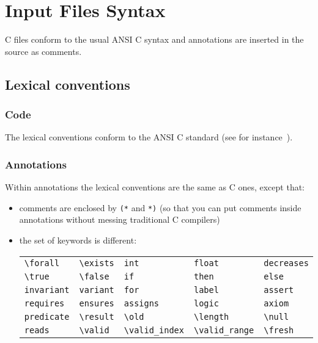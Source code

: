 \documentclass[a4paper,12pt]{report}
\def\result{\char'134 result}
\def\forall{\char'134 forall}
\def\old{\char'134 old}
\begin{document}
\section{Input Files Syntax}
\label{syntax}

C files conform to the usual ANSI C
syntax and annotations are inserted in the source as comments.

\subsection{Lexical conventions}
\label{lexical:c}

\subsubsection{Code}

The lexical conventions conform to the ANSI C standard (see
for instance~\cite{KR88}).

\subsubsection{Annotations}

Within annotations the lexical conventions are the same as C ones,
except that:
\begin{itemize}
\item comments are enclosed by \texttt{(*} and \texttt{*)} (so that
  you can put comments inside annotations without messing traditional
  C compilers)
\item the set of keywords is different: \par
  \begin{center}
  \begin{tabular}{l@{\qquad}l@{\qquad}l@{\qquad}l@{\qquad}l}
  \verb!\forall! & \verb!\exists! & \verb!int! & \verb!float! &
  \verb!decreases! \\
  \verb!\true! & \verb!\false! & \verb!if! & \verb!then! & \verb!else! \\
  \verb!invariant! & \verb!variant! & \verb!for! & \verb!label! & 
  \verb!assert! \\ 
  \verb!requires! & \verb!ensures! & \verb!assigns! & \verb!logic! & 
  \verb!axiom! \\
  \verb!predicate! & \verb!\result! & \verb!\old! & 
  \verb!\length! & \verb!\null! \\
  \verb!reads! & \verb!\valid! & \verb!\valid_index! &
  \verb!\valid_range! & \verb!\fresh!
  \end{tabular}
  \end{center}
\end{itemize}
\end{document}
